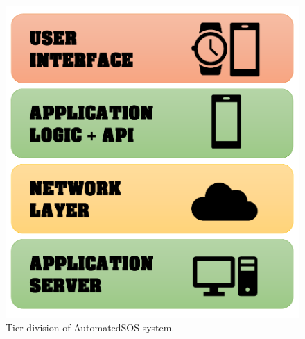 \documentclass[a4paper]{article}
\begin{document}
\begin{figure}[H]
    \centering
    \includegraphics[width=\linewidth]{AutomatedSOS-tier-division}
    \caption{Tier division of AutomatedSOS system.}
    \label{fig:my_label}
\end{figure}
\end{document}
